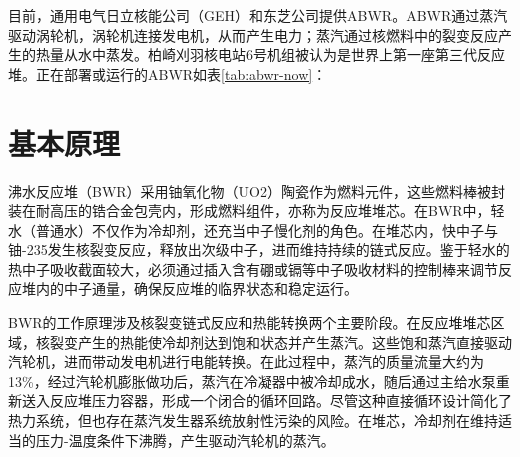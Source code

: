 \documentclass{article}
\begin{document}
目前，通用电气日立核能公司（GEH）和东芝公司提供ABWR。ABWR通过蒸汽驱动涡轮机，涡轮机连接发电机，从而产生电力；蒸汽通过核燃料中的裂变反应产生的热量从水中蒸发。柏崎刈羽核电站6号机组被认为是世界上第一座第三代反应堆。正在部署或运行的ABWR如表\ref{tab:abwr-now}：

\begin{table}[ht]
    \centering
    \caption{目前正在部署或运行的ABWR}
    \label{tab:abwr-now}
\end{table}

\section{基本原理}

沸水反应堆（BWR）采用铀氧化物（UO2）陶瓷作为燃料元件，这些燃料棒被封装在耐高压的锆合金包壳内，形成燃料组件，亦称为反应堆堆芯。在BWR中，轻水（普通水）不仅作为冷却剂，还充当中子慢化剂的角色。在堆芯内，快中子与铀-235发生核裂变反应，释放出次级中子，进而维持持续的链式反应。鉴于轻水的热中子吸收截面较大，必须通过插入含有硼或镉等中子吸收材料的控制棒来调节反应堆内的中子通量，确保反应堆的临界状态和稳定运行。\cite{dunbarBoilingWaterReactors2024}

BWR的工作原理涉及核裂变链式反应和热能转换两个主要阶段。在反应堆堆芯区域，核裂变产生的热能使冷却剂达到饱和状态并产生蒸汽。这些饱和蒸汽直接驱动汽轮机，进而带动发电机进行电能转换。在此过程中，蒸汽的质量流量大约为13\%，经过汽轮机膨胀做功后，蒸汽在冷凝器中被冷却成水，随后通过主给水泵重新送入反应堆压力容器，形成一个闭合的循环回路。尽管这种直接循环设计简化了热力系统，但也存在蒸汽发生器系统放射性污染的风险。在堆芯，冷却剂在维持适当的压力-温度条件下沸腾，产生驱动汽轮机的蒸汽。\cite{robinIntroductionNuclearReactors}
\end{document}
